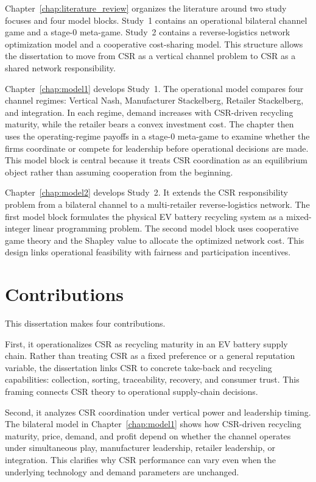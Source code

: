 Chapter~\ref{chap:literature_review} organizes the literature around two study focuses and four model blocks. Study~1 contains an operational bilateral channel game and a stage-0 meta-game. Study~2 contains a reverse-logistics network optimization model and a cooperative cost-sharing model. This structure allows the dissertation to move from CSR as a vertical channel problem to CSR as a shared network responsibility.

Chapter~\ref{chap:model1} develops Study~1. The operational model compares four channel regimes: Vertical Nash, Manufacturer Stackelberg, Retailer Stackelberg, and integration. In each regime, demand increases with CSR-driven recycling maturity, while the retailer bears a convex investment cost. The chapter then uses the operating-regime payoffs in a stage-0 meta-game to examine whether the firms coordinate or compete for leadership before operational decisions are made. This model block is central because it treats CSR coordination as an equilibrium object rather than assuming cooperation from the beginning.

Chapter~\ref{chap:model2} develops Study~2. It extends the CSR responsibility problem from a bilateral channel to a multi-retailer reverse-logistics network. The first model block formulates the physical EV battery recycling system as a mixed-integer linear programming problem. The second model block uses cooperative game theory and the Shapley value to allocate the optimized network cost. This design links operational feasibility with fairness and participation incentives.

\section{Contributions}
\label{sec:intro_contributions}

This dissertation makes four contributions.

First, it operationalizes CSR as recycling maturity in an EV battery supply chain. Rather than treating CSR as a fixed preference or a general reputation variable, the dissertation links CSR to concrete take-back and recycling capabilities: collection, sorting, traceability, recovery, and consumer trust. This framing connects CSR theory to operational supply-chain decisions.

Second, it analyzes CSR coordination under vertical power and leadership timing. The bilateral model in Chapter~\ref{chap:model1} shows how CSR-driven recycling maturity, price, demand, and profit depend on whether the channel operates under simultaneous play, manufacturer leadership, retailer leadership, or integration. This clarifies why CSR performance can vary even when the underlying technology and demand parameters are unchanged.


